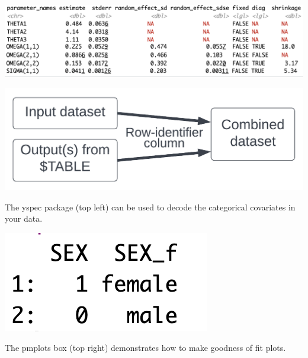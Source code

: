 \documentclass[portrait,fontscale=0.46,paperwidth=36in,paperheight=48in]{baposter}
\begin{document}
\begin{poster}
{\begin{minipage}[c]{0.333\linewidth}
\begin{demobx}[]
\begin{minipage}[c]{0.45\linewidth}
		\end{minipage}



		\includegraphics[scale=0.3]{"images/param-estimates-reduced.png"} 

		\begin{minipage}[c]{0.55\linewidth}



		\end{minipage}
		\begin{minipage}[c]{0.4\linewidth}
			\includegraphics[scale=0.15]{"images/nm_join.png"}
		\end{minipage}
		

		The yspec package (top left) can be used to decode the categorical covariates in your data.
		
		\begin{minipage}[c]{0.6\linewidth}
		\end{minipage}
		\begin{minipage}[c]{0.35\linewidth}
			\vspace{-4mm}
			\includegraphics[scale=0.35]{"images/decode.png"} 
		\end{minipage}
		The pmplots box (top right) demonstrates how to make goodness of fit plots.


\end{demobx}
\end{minipage}}
\end{poster}
\end{document}
